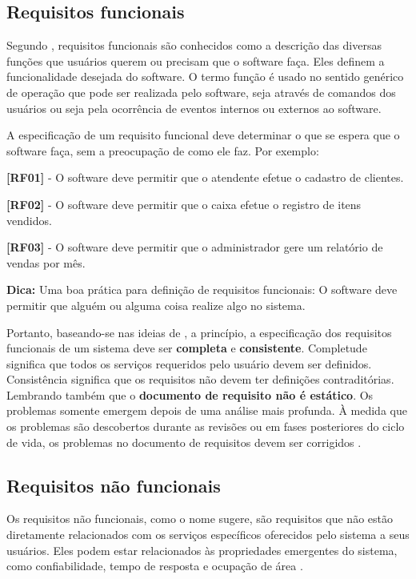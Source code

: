 \subsection{Requisitos funcionais}

Segundo , requisitos funcionais são conhecidos como a descrição das diversas funções que usuários querem ou precisam que o software faça. Eles definem a funcionalidade desejada do software. O termo função é usado no sentido genérico de operação que pode ser realizada pelo software, seja através de comandos dos usuários ou seja pela ocorrência de eventos internos ou externos ao software.

A especificação de um requisito funcional deve determinar o que se espera que o software faça, sem a preocupação de como ele faz. Por exemplo: 

\textbf{[RF01]} - O software deve permitir que o atendente efetue o cadastro de clientes.

\textbf{[RF02]} - O software deve permitir que o caixa efetue o registro de itens vendidos.

\textbf{[RF03]} - O software deve permitir que o administrador gere um relatório de vendas por mês.

\textbf{Dica:}
Uma boa prática para definição de requisitos funcionais: O software deve permitir que alguém ou alguma coisa realize algo no sistema.

Portanto, baseando-se nas ideias de , a princípio, a especificação dos requisitos funcionais de um sistema deve ser \textbf{completa} e \textbf{consistente}. Completude significa que todos os serviços requeridos pelo usuário devem ser definidos. Consistência significa que os requisitos não devem ter definições contraditórias. Lembrando também que o \textbf{documento de requisito não é estático}. Os problemas somente emergem depois de uma análise mais profunda. À medida que os problemas são descobertos durante as revisões ou em fases posteriores do ciclo de vida, os problemas no documento de requisitos devem ser corrigidos \cite{sommerville2003engenharia}.

\subsection{Requisitos não funcionais}

Os requisitos não funcionais, como o nome sugere, são requisitos que não estão diretamente relacionados com os serviços específicos oferecidos pelo sistema a seus usuários. Eles podem estar relacionados às propriedades emergentes do sistema, como confiabilidade, tempo de resposta e ocupação de área \cite{sommerville2016software}. 

